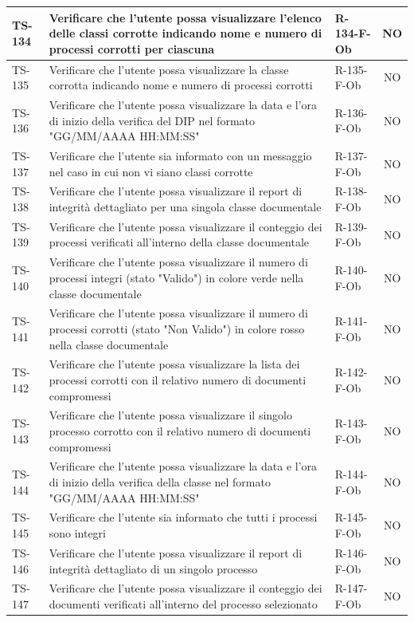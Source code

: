 \documentclass[a4paper,12pt]{article}
\begin{document}
\begin{longtable}{|p{1.5cm}|p{8.3cm}|p{2.4cm}|c|}
\hline
TS-134 & Verificare che l'utente possa visualizzare l'elenco delle classi corrotte indicando nome e numero di processi corrotti per ciascuna & R-134-F-Ob & NO \\
\hline
TS-135 & Verificare che l'utente possa visualizzare la classe corrotta indicando nome e numero di processi corrotti & R-135-F-Ob & NO \\
\hline
TS-136 & Verificare che l'utente possa visualizzare la data e l'ora di inizio della verifica del DIP nel formato "GG/MM/AAAA HH:MM:SS" & R-136-F-Ob & NO \\
\hline
TS-137 & Verificare che l'utente sia informato con un messaggio nel caso in cui non vi siano classi corrotte & R-137-F-Ob & NO \\
\hline
TS-138 & Verificare che l'utente possa visualizzare il report di integrità dettagliato per una singola classe documentale & R-138-F-Ob & NO \\
\hline
TS-139 & Verificare che l'utente possa visualizzare il conteggio dei processi verificati all'interno della classe documentale & R-139-F-Ob & NO \\
\hline
TS-140 & Verificare che l'utente possa visualizzare il numero di processi integri (stato "Valido") in colore verde nella classe documentale & R-140-F-Ob & NO \\
\hline
TS-141 & Verificare che l'utente possa visualizzare il numero di processi corrotti (stato "Non Valido") in colore rosso nella classe documentale & R-141-F-Ob & NO \\
\hline
TS-142 & Verificare che l'utente possa visualizzare la lista dei processi corrotti con il relativo numero di documenti compromessi & R-142-F-Ob & NO \\
\hline
TS-143 & Verificare che l'utente possa visualizzare il singolo processo corrotto con il relativo numero di documenti compromessi & R-143-F-Ob & NO \\
\hline
TS-144 & Verificare che l'utente possa visualizzare la data e l'ora di inizio della verifica della classe nel formato "GG/MM/AAAA HH:MM:SS" & R-144-F-Ob & NO \\
\hline
TS-145 & Verificare che l'utente sia informato che tutti i processi sono integri & R-145-F-Ob & NO \\
\hline
TS-146 & Verificare che l'utente possa visualizzare il report di integrità dettagliato di un singolo processo & R-146-F-Ob & NO \\
\hline
TS-147 & Verificare che l'utente possa visualizzare il conteggio dei documenti verificati all'interno del processo selezionato & R-147-F-Ob & NO \\

\end{longtable}
\end{document}
